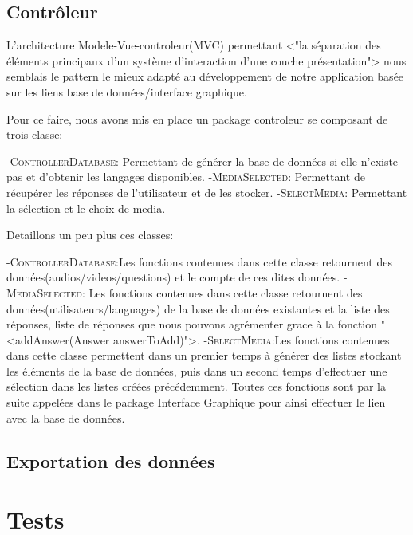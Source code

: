 \subsection{Contrôleur}

L'architecture Modele-Vue-controleur(MVC) permettant <"la séparation des éléments principaux d'un système d'interaction d'une couche présentation"> nous semblais le pattern le mieux adapté au développement de notre application basée sur les liens base de données/interface graphique.

Pour ce faire, nous avons mis en place un package controleur se composant de trois classe:

	-\textsc{ControllerDatabase}: Permettant de générer la base de données si elle n'existe pas et d'obtenir les langages disponibles.
	-\textsc{MediaSelected}: Permettant de récupérer les réponses de l'utilisateur et de les stocker.
	-\textsc{SelectMedia}: Permettant la sélection et le choix de media.
	
Detaillons un peu plus ces classes:

	-\textsc{ControllerDatabase}:Les fonctions contenues dans cette classe retournent des données(audios/videos/questions) et le compte de ces dites données.
	-\textsc{MediaSelected}: Les fonctions contenues dans cette classe retournent des données(utilisateurs/languages) de la base de données existantes et la liste des réponses, liste de réponses que nous pouvons agrémenter grace à la fonction "<addAnswer(Answer answerToAdd)">.
	-\textsc{SelectMedia}:Les fonctions contenues dans cette classe permettent dans un premier temps à générer des listes stockant les éléments de la base de données, puis dans un second temps d'effectuer une sélection dans les listes créées précédemment.
	Toutes ces fonctions sont par la suite appelées dans le package Interface Graphique pour ainsi effectuer le lien avec la base de données.
	
\subsection{Exportation des données}
\lipsum[8]


\section{Tests}\label{tests}
